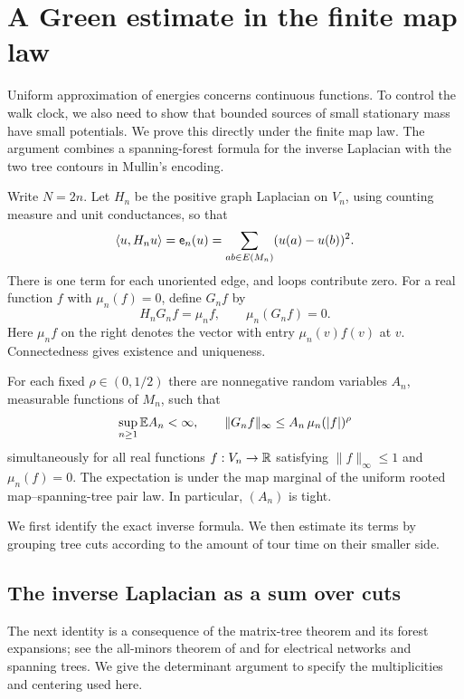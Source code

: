 \section{A Green estimate in the finite map law}
\label{sec:green}

Uniform approximation of energies concerns continuous functions.  To
control the walk clock, we also need to show that bounded sources of
small stationary mass have small potentials.  We prove this directly
under the finite map law.  The argument combines a spanning-forest
formula for the inverse Laplacian with the two tree contours in
Mullin's encoding.

Write $N=2n$.  Let $H_n$ be the positive graph Laplacian on $V_n$,
using counting measure and unit conductances, so that
\[
 \langle u,H_nu\rangle=\mathsf e_n(u)
       =\sum_{ab\in E(M_n)}(u(a)-u(b))^2.
\]
There is one term for each unoriented edge, and loops contribute zero.
For a real function $f$ with $\mu_n(f)=0$, define $G_nf$ by
\begin{equation}\label{gr:green-definition}
 H_nG_nf=\mu_n f,
 \qquad \mu_n(G_nf)=0.
\end{equation}
Here $\mu_nf$ on the right denotes the vector with entry
$\mu_n(v)f(v)$ at $v$.  Connectedness gives existence and uniqueness.

\begin{proposition}
\label{gr:green-bound}
For each fixed $\rho\in(0,1/2)$ there are nonnegative random variables
$A_n$, measurable functions of $M_n$, such that
\begin{equation}\label{gr:green-main}
 \sup_{n\geq1}\mathbb E A_n<\infty,
 \qquad
 \|G_nf\|_\infty\leq A_n\,\mu_n(|f|)^\rho
\end{equation}
simultaneously for all real functions $f:V_n\to\mathbb R$ satisfying
$\|f\|_\infty\leq1$ and $\mu_n(f)=0$.
The expectation is under the map marginal of the uniform rooted
map--spanning-tree pair law.  In particular, $(A_n)$ is tight.
\end{proposition}

We first identify the exact inverse formula.  We then estimate its
terms by grouping tree cuts according to the amount of tour time on
their smaller side.

\subsection{The inverse Laplacian as a sum over cuts}

The next identity is a consequence of the matrix-tree theorem and
its forest expansions; see the all-minors theorem of \cite{Chaiken}
and \cite[Chapter~4]{LP} for electrical networks and spanning trees.
We give the determinant argument to specify the multiplicities and
centering used here.

